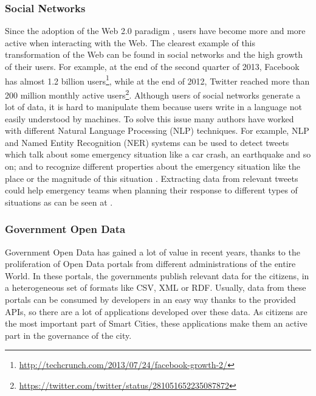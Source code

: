 \subsubsection{Social Networks}\label{social_networks}

Since the adoption of the Web 2.0 paradigm \cite{oreilly_what_2007}, users have become more and more active when interacting with the Web. The clearest example of this transformation of the Web can be found in social networks and the high growth of their users. For example, at the end of the second quarter of 2013, Facebook has almost 1.2 billion users\footnote{\url{http://techcrunch.com/2013/07/24/facebook-growth-2/}}, while at the end of 2012, Twitter reached more than 200 million monthly active users\footnote{\url{https://twitter.com/twitter/status/281051652235087872}}. Although users of social networks generate a lot of data, it is hard to manipulate them because users write in a language not easily understood by machines. To solve this issue many authors have worked with different Natural Language Processing (NLP) techniques. For example, NLP and Named Entity Recognition (NER) systems \cite{maynard_named_2001} can be used to detect tweets which talk about some emergency situation like a car crash, an earthquake and so on; and to recognize different properties about the emergency situation like the place or the magnitude of this situation \cite{sixto_enable_geolocation,martins_machine_2010}. Extracting data from relevant tweets could help emergency teams when planning their response to different types of situations as can be seen at \cite{abel_twitcident:_2012,vieweg_microblogging_2010,hughes_twitter_2009}.


\subsubsection{Government Open Data}

Government Open Data has gained a lot of value in recent years, thanks to the proliferation of Open Data portals from different administrations of the entire World. In these portals, the governments publish relevant data for the citizens, in a heterogeneous set of formats like CSV, XML or RDF. Usually, data from these portals can be consumed by developers in an easy way thanks to the provided APIs, so there are a lot of applications developed over these data. As citizens are the most important part of Smart Cities, these applications make them an active part in the governance of the city.

